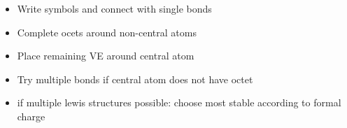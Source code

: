 \begin{itemize}
    \itemsep0em
    \item Write symbols and connect with single bonds
    \item Complete ocets around non-central atoms
    \item Place remaining VE around central atom
    \item Try multiple bonds if central atom does not have octet
    \item if multiple lewis structures possible: choose most stable according to formal charge
    
\end{itemize}